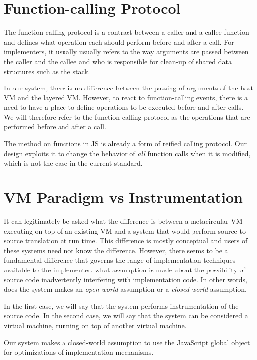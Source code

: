 \section{Function-calling Protocol}

The function-calling protocol is a contract between a caller and a callee
function and defines what operation each should perform before and after a
call. For implementers, it usually usually refers to the way arguments are
passed between the caller and the callee and who is responsible for clean-up of
shared data structures such as the stack.

In our system, there is no difference between the passing of arguments of the
host VM and the layered VM. However, to react to function-calling events, there
is a need to have a place to define operations to be executed before and after
calls. We will therefore refer to the function-calling protocol as the
operations that are performed before and after a call. 

The  method on functions in JS is already a form of reified calling
protocol. Our design exploits it to change the behavior of \textit{all} function
calls when it is modified, which is not the case in the current standard.

\section{VM Paradigm vs Instrumentation}

It can legitimately be asked what the difference is between a metacircular VM
executing on top of an existing VM and a system that would perform
source-to-source translation at run time. This difference is mostly conceptual
and users of these systems need not know the difference. However, there seems
to be a fundamental difference that governs the range of implementation
techniques available to the implementer: what assumption is made about the
possibility of source code inadvertently interfering with implementation code.
In other words, does the system makes an \textit{open-world} assumption or a
\textit{closed-world} assumption.

In the first case, we will say that the system performs instrumentation of the
source code. In the second case, we will say that the system can be considered
a virtual machine, running on top of another virtual machine. 

Our system makes a closed-world assumption to use the JavaScript global object
for optimizations of implementation mechanisms.

